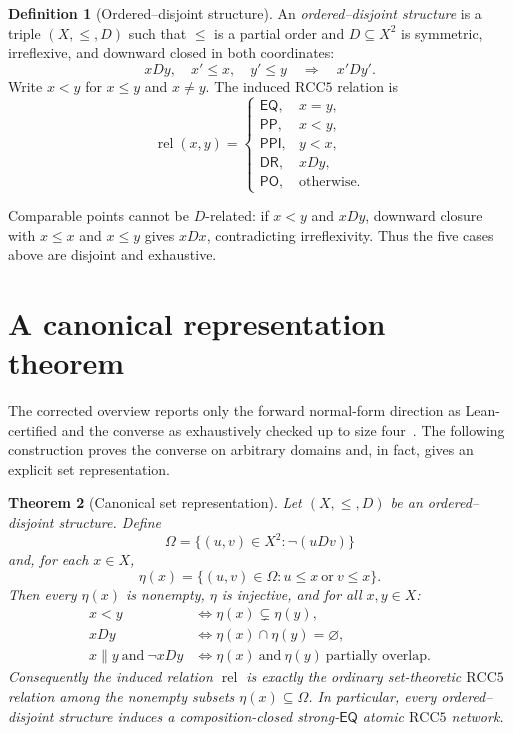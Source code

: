 \documentclass[11pt]{article}
\newtheorem{theorem}{Theorem}[section]
\theoremstyle{definition}
\newtheorem{definition}[theorem]{Definition}
\theoremstyle{remark}
\newcommand{\RCC}{\mathrm{RCC5}}
\newcommand{\EQ}{\mathsf{EQ}}
\newcommand{\PP}{\mathsf{PP}}
\newcommand{\PPI}{\mathsf{PPI}}
\newcommand{\PO}{\mathsf{PO}}
\newcommand{\DR}{\mathsf{DR}}
\newcommand{\Rel}{\operatorname{rel}}
\begin{document}
\begin{definition}[Ordered--disjoint structure]
An \emph{ordered--disjoint structure} is a triple $(X,\leq,D)$ such that $\leq$ is a partial order and $D\subseteq X^2$ is symmetric, irreflexive, and downward closed in both coordinates:
\[
 xDy,\quad x'\leq x,\quad y'\leq y
 \quad\Longrightarrow\quad x'Dy'.
\]
Write $x<y$ for $x\leq y$ and $x\neq y$.  The induced $\RCC$ relation is
\[
\Rel(x,y)=
\begin{cases}
\EQ,&x=y,\\
\PP,&x<y,\\
\PPI,&y<x,\\
\DR,&xDy,\\
\PO,&\text{otherwise.}
\end{cases}
\]
\end{definition}

Comparable points cannot be $D$-related: if $x<y$ and $xDy$, downward closure with $x\leq x$ and $x\leq y$ gives $xDx$, contradicting irreflexivity.  Thus the five cases above are disjoint and exhaustive.

\section{A canonical representation theorem}

The corrected overview reports only the forward normal-form direction as Lean-certified and the converse as exhaustively checked up to size four~\cite[p.~25]{WesselOverviewCorrected}.  The following construction proves the converse on arbitrary domains and, in fact, gives an explicit set representation.

\begin{theorem}[Canonical set representation]\label{thm:representation}
Let $(X,\leq,D)$ be an ordered--disjoint structure.  Define
\[
  \Omega=\{(u,v)\in X^2: \neg(uDv)\}
\]
and, for each $x\in X$,
\[
  \eta(x)=\{(u,v)\in\Omega: u\leq x\ \text{or}\ v\leq x\}.
\]
Then every $\eta(x)$ is nonempty, $\eta$ is injective, and for all $x,y\in X$:
\begin{align*}
 x<y &\iff \eta(x)\subsetneq\eta(y),\\
 xDy &\iff \eta(x)\cap\eta(y)=\varnothing,\\
 x\parallel y\ \text{and}\ \neg xDy
   &\iff \eta(x)\ \text{and}\ \eta(y)\ \text{partially overlap}.
\end{align*}
Consequently the induced relation $\Rel$ is exactly the ordinary set-theoretic $\RCC$ relation among the nonempty subsets $\eta(x)\subseteq\Omega$.  In particular, every ordered--disjoint structure induces a composition-closed strong-$\EQ$ atomic $\RCC$ network.
\end{theorem}
\end{document}

